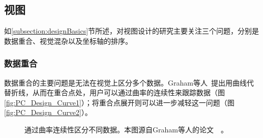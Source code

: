 \documentclass[12pt,twocolumn]{article}
\begin{document}
\subsection{视图}
\label{subsection:designImpro}

如\ref{subsection:designBasics}节所述，对视图设计的研究主要关注三个问题，分别是数据重合、视觉混杂以及坐标轴的排序。

\subsubsection{数据重合}
\label{subsection:dataCoincidence}

数据重合的主要问题是无法在视觉上区分多个数据。Graham等人~\citep{graham2003using}提出用曲线代替折线，从而在重合点处，用户可以通过曲率的连续性来跟踪数据（图\ref{fig:PC_Design_Curve1}）；将重合点展开则可以进一步减轻这一问题（图\ref{fig:PC_Design_Curve2}）。

\begin{figure}[!htb]
\centering
{}
\caption{通过曲率连续性区分不同数据。本图源自Graham等人的论文~\citep{graham2003using}~。}
\end{figure}
\end{document}
